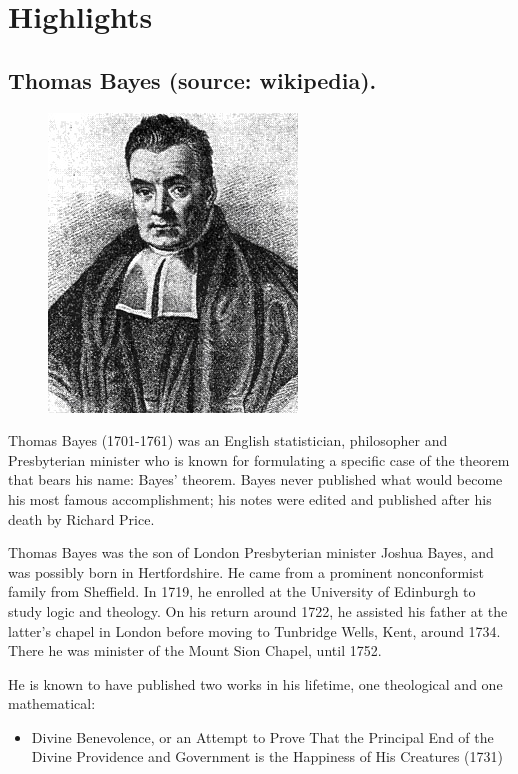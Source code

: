 \documentclass[english,graybox,envcountchap,envcountsame,sectrefs,shortlabels]{svmono}
\theoremstyle{style}
\begin{document}
\section*{Highlights}

\begin{subappendices}

\section{Thomas Bayes (source: wikipedia).}

\begin{figure} \centering

\includegraphics[scale=0.45]{bayes}

\end{figure}
Thomas Bayes (1701-1761) was an English statistician, philosopher and Presbyterian minister who is known for formulating a specific case of the theorem that bears his name: Bayes' theorem. Bayes never published what would become his most famous accomplishment; his notes were edited and published after his death by Richard Price.

Thomas Bayes was the son of London Presbyterian minister Joshua Bayes, and was possibly born in Hertfordshire. He came from a prominent nonconformist family from Sheffield. In 1719, he enrolled at the University of Edinburgh to study logic and theology. On his return around 1722, he assisted his father at the latter's chapel in London before moving to Tunbridge Wells, Kent, around 1734. There he was minister of the Mount Sion Chapel, until 1752.

He is known to have published two works in his lifetime, one theological and one mathematical:

\begin{itemize}
\item Divine Benevolence, or an Attempt to Prove That the Principal End of the Divine Providence and Government is the Happiness of His Creatures (1731)
\end{itemize}


\end{subappendices}
\end{document}
